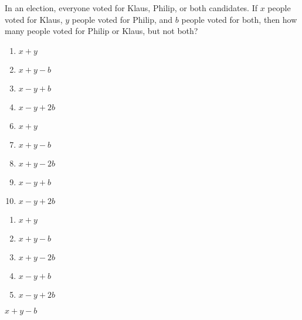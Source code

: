 



 In an election, everyone voted for Klaus, Philip, or both candidates.  If $x$ people voted for Klaus, $y$ people voted for Philip, and $b$ people voted for both, then how many people voted for Philip or Klaus, but not both? 


\ifsat
	\begin{enumerate}[label=\Alph*)]
		\item   $x+y$
		\item  $x+y-b$ %
		\item  $x-y+b$
		\item  $x-y+2b$
	\end{enumerate}
\else
\fi

\ifacteven
	\begin{enumerate}[label=\textbf{\Alph*.},itemsep=\fill,align=left]
		\setcounter{enumii}{5}
		\item   $x+y$
		\item  $x+y-b$ %
		\item  $x+y-2b$
		\addtocounter{enumii}{1}
		\item  $x-y+b$
		\item  $x-y+2b$
	\end{enumerate}
\else
\fi

\ifactodd
	\begin{enumerate}[label=\textbf{\Alph*.},itemsep=\fill,align=left]
		\item   $x+y$
		\item  $x+y-b$ %
		\item  $x+y-2b$
		\item  $x-y+b$
		\item  $x-y+2b$
	\end{enumerate}
\else
\fi

\ifgridin
  $x+y-b$ %
		
\else
\fi

